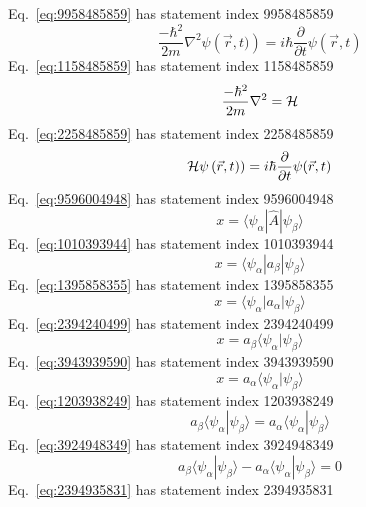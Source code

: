 \documentclass[12pt]{report}
\newcommand{\bra}[1]{\langle #1 |}
\newcommand{\ket}[1]{| #1\rangle}
\newcommand{\braket}[2]{\langle #1 | #2 \rangle}
\begin{document}
Eq.~\ref{eq:9958485859} has statement index 9958485859
\begin{equation}
\frac{-\hbar^2}{2m} \nabla^2 \psi\left(\vec{r},t)\right) = i \hbar \frac{\partial}{\partial t}\psi(\vec{r},t) 
\label{eq:9958485859}
\end{equation}
Eq.~\ref{eq:1158485859} has statement index 1158485859
\begin{equation}
\frac{-\hbar^2}{2m} \nabla^2 = {\cal H} 
\label{eq:1158485859}
\end{equation}
Eq.~\ref{eq:2258485859} has statement index 2258485859
\begin{equation}
{\cal H} \psi\left(\vec{r},t)\right) = i \hbar \frac{\partial}{\partial t}\psi(\vec{r},t) 
\label{eq:2258485859}
\end{equation}
Eq.~\ref{eq:9596004948} has statement index 9596004948
\begin{equation}
x = \bra{\psi_{\alpha}} \hat{A} \ket{\psi_{\beta}}
\label{eq:9596004948}
\end{equation}
Eq.~\ref{eq:1010393944} has statement index 1010393944
\begin{equation}
x = \bra{\psi_{\alpha}} a_{\beta} \ket{\psi_{\beta}}
\label{eq:1010393944}
\end{equation}
Eq.~\ref{eq:1395858355} has statement index 1395858355
\begin{equation}
x = \bra{\psi_{\alpha}} a_{\alpha} \ket{\psi_{\beta}}
\label{eq:1395858355}
\end{equation}
Eq.~\ref{eq:2394240499} has statement index 2394240499
\begin{equation}
x = a_{\beta} \braket{\psi_{\alpha}}{\psi_{\beta}}
\label{eq:2394240499}
\end{equation}
Eq.~\ref{eq:3943939590} has statement index 3943939590
\begin{equation}
x = a_{\alpha} \braket{\psi_{\alpha}}{\psi_{\beta}}
\label{eq:3943939590}
\end{equation}
Eq.~\ref{eq:1203938249} has statement index 1203938249
\begin{equation}
a_{\beta} \braket{\psi_{\alpha}}{\psi_{\beta}} = a_{\alpha} \braket{\psi_{\alpha}}{\psi_{\beta}}
\label{eq:1203938249}
\end{equation}
Eq.~\ref{eq:3924948349} has statement index 3924948349
\begin{equation}
a_{\beta} \braket{\psi_{\alpha}}{\psi_{\beta}} - a_{\alpha} \braket{\psi_{\alpha}}{\psi_{\beta}} = 0
\label{eq:3924948349}
\end{equation}
Eq.~\ref{eq:2394935831} has statement index 2394935831
\end{document}
